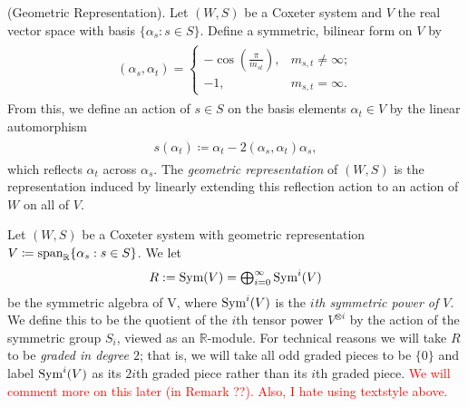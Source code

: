 \noindent\begin{definition}\label{GeometricRepresentation}\textnormal{(Geometric Representation).} Let $(W, S)$ be a Coxeter system and $V$ the real vector space with basis $\{\alpha_s : s \in S\}$. Define a symmetric, bilinear form on $V$ by%
\begin{align*}
\begin{split}
(\alpha_s, \alpha_t) = \begin{cases}-\cos\!\left(\frac{\pi}{m_{st}}\right)\!,&m_{s,t} \neq \infty;\\-1,&m_{s,t} = \infty.\end{cases}
\end{split}
\end{align*}
\noindent From this, we define an action of $s \in S$ on the basis elements $\alpha_t \in V$ by the linear automorphism
\begin{align*}
\begin{split}
s(\alpha_t) \coloneqq \alpha_t - 2(\alpha_s, \alpha_t)\alpha_s,
\end{split}
\end{align*}
\noindent which reflects $\alpha_t$ across $\alpha_s$. The {\em geometric representation} of $(W, S)$ is the representation induced by linearly extending this reflection action to an action of $W$ on all of $V$.\\
\end{definition}

\noindent Let $(W, S)$ be a Coxeter system with geometric representation $V \coloneqq \textnormal{span}_\mathbb{R}\{\alpha_s : s \in S\}$. We let
\begin{align*}
\begin{split}
\textstyle{R := \textnormal{Sym}(V) = \bigoplus_{i=0}^\infty \textnormal{Sym}^i(V)}
\end{split}
\end{align*}
be the symmetric algebra of V, where $\textnormal{Sym}^i(V)$ is the {\em $i$th symmetric power of $V$}. We define this to be the quotient of the $i$th tensor power $V^{\otimes i}$ by the action of the symmetric group $S_i$, viewed as an $\mathbb{R}$-module. For technical reasons we will take $R$ to be {\em graded in degree $2$}; that is, we will take all odd graded pieces to be $\{0\}$ and label $\textnormal{Sym}^i(V)$ as its $2i$th graded piece rather than its $i$th graded piece. \textcolor{red}{We will comment more on this later (in Remark ??). Also, I hate using textstyle above.}\\

